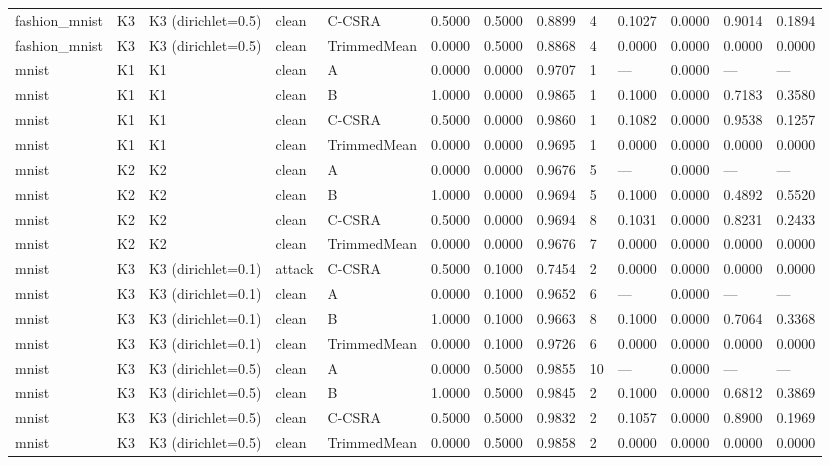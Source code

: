 \begin{table}[htbp]
\begin{tabular}{lllllllllllll}
fashion_mnist & K3 & K3 (dirichlet=0.5) & clean & C-CSRA & 0.5000 & 0.5000 & 0.8899 & 4 & 0.1027 & 0.0000 & 0.9014 & 0.1894 \\
fashion_mnist & K3 & K3 (dirichlet=0.5) & clean & TrimmedMean & 0.0000 & 0.5000 & 0.8868 & 4 & 0.0000 & 0.0000 & 0.0000 & 0.0000 \\
mnist & K1 & K1 & clean & A & 0.0000 & 0.0000 & 0.9707 & 1 & — & 0.0000 & — & — \\
mnist & K1 & K1 & clean & B & 1.0000 & 0.0000 & 0.9865 & 1 & 0.1000 & 0.0000 & 0.7183 & 0.3580 \\
mnist & K1 & K1 & clean & C-CSRA & 0.5000 & 0.0000 & 0.9860 & 1 & 0.1082 & 0.0000 & 0.9538 & 0.1257 \\
mnist & K1 & K1 & clean & TrimmedMean & 0.0000 & 0.0000 & 0.9695 & 1 & 0.0000 & 0.0000 & 0.0000 & 0.0000 \\
mnist & K2 & K2 & clean & A & 0.0000 & 0.0000 & 0.9676 & 5 & — & 0.0000 & — & — \\
mnist & K2 & K2 & clean & B & 1.0000 & 0.0000 & 0.9694 & 5 & 0.1000 & 0.0000 & 0.4892 & 0.5520 \\
mnist & K2 & K2 & clean & C-CSRA & 0.5000 & 0.0000 & 0.9694 & 8 & 0.1031 & 0.0000 & 0.8231 & 0.2433 \\
mnist & K2 & K2 & clean & TrimmedMean & 0.0000 & 0.0000 & 0.9676 & 7 & 0.0000 & 0.0000 & 0.0000 & 0.0000 \\
mnist & K3 & K3 (dirichlet=0.1) & attack & C-CSRA & 0.5000 & 0.1000 & 0.7454 & 2 & 0.0000 & 0.0000 & 0.0000 & 0.0000 \\
mnist & K3 & K3 (dirichlet=0.1) & clean & A & 0.0000 & 0.1000 & 0.9652 & 6 & — & 0.0000 & — & — \\
mnist & K3 & K3 (dirichlet=0.1) & clean & B & 1.0000 & 0.1000 & 0.9663 & 8 & 0.1000 & 0.0000 & 0.7064 & 0.3368 \\
mnist & K3 & K3 (dirichlet=0.1) & clean & TrimmedMean & 0.0000 & 0.1000 & 0.9726 & 6 & 0.0000 & 0.0000 & 0.0000 & 0.0000 \\
mnist & K3 & K3 (dirichlet=0.5) & clean & A & 0.0000 & 0.5000 & 0.9855 & 10 & — & 0.0000 & — & — \\
mnist & K3 & K3 (dirichlet=0.5) & clean & B & 1.0000 & 0.5000 & 0.9845 & 2 & 0.1000 & 0.0000 & 0.6812 & 0.3869 \\
mnist & K3 & K3 (dirichlet=0.5) & clean & C-CSRA & 0.5000 & 0.5000 & 0.9832 & 2 & 0.1057 & 0.0000 & 0.8900 & 0.1969 \\
mnist & K3 & K3 (dirichlet=0.5) & clean & TrimmedMean & 0.0000 & 0.5000 & 0.9858 & 2 & 0.0000 & 0.0000 & 0.0000 & 0.0000 \\
\bottomrule
\end{tabular}
\end{table}